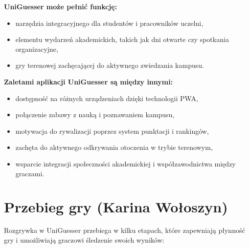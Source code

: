 \bigskip
\noindent
\textbf{UniGuesser może pełnić funkcję:}
\begin{itemize}
    \item narzędzia integracyjnego dla studentów i pracowników uczelni,
    \item elementu wydarzeń akademickich, takich jak dni otwarte czy spotkania organizacyjne,
    \item gry terenowej zachęcającej do aktywnego zwiedzania kampusu.
\end{itemize}

\bigskip
\noindent
\textbf{Zaletami aplikacji UniGuesser są między innymi:}
\begin{itemize}
    \item dostępność na różnych urządzeniach dzięki technologii PWA,
    \item połączenie zabawy z nauką i poznawaniem kampusu,
    \item motywacja do rywalizacji poprzez system punktacji i rankingów,
    \item zachęta do aktywnego odkrywania otoczenia w trybie terenowym,
    \item wsparcie integracji społeczności akademickiej i współzawodnictwa między graczami.
\end{itemize}

\section{Przebieg gry (Karina Wołoszyn)}

Rozgrywka w UniGuesser przebiega w kilku etapach, które zapewniają płynność gry i umożliwiają graczowi śledzenie swoich wyników:

